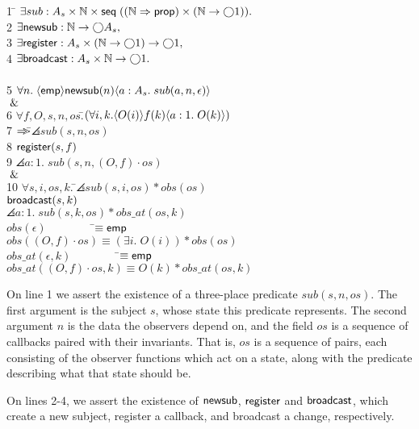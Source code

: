 \begin{tabbing}
1 \qquad \= $\exists sub : A_s \times \mathbb{N} \times \mathsf{seq}\;{((\mathbb{N} \Rightarrow \mathsf{prop}) \times (\mathbb{N} \to \bigcirc{1}))}.$ \\
2 \> $\exists \mathsf{newsub} : \mathbb{N} \to \bigcirc{A_s},$ \\ 
3 \> $\exists \mathsf{register} : A_s \times (\mathbb{N} \to \bigcirc{1}) \to \bigcirc{1},$ \\
4 \> $\exists \mathsf{broadcast} : A_s \times \mathbb{N} \to \bigcirc{1}.$ \\
\\[0.5em]
5 \>$\forall n.\; \langle{\mathsf{emp}}\rangle{{\mathsf{newsub}(n)}}\langle{a:A_s}.\;{sub(a, n, \epsilon)}\rangle$ \\
\> $\;\&\;$ \\
6 \> $\forall f, O, s, n, os. $\=$(\forall i, k. \langle{O(i)}\rangle{{f(k)}}\langle{a:1}.\;{O(k)}\rangle)$ \\
7\> \>$\Rightarrow\!\!\!>$\=$\angles{sub(s, n, os)}$ \\
8\> \>          \>${\mathsf{register}(s, f)}$ \\
9 \> \>          \>$\angles{a:1.\; sub(s, n, (O,f)\cdot os)}$ \\
\> $\;\&\;$ \\
10 \> $\forall s,i,os,k.\; $\=$\angles{sub(s, i, os) * obs(os)}$ \\
  \>                       \>${\mathsf{broadcast}}(s,k)$ \\
  \>                       \>$\angles{a:1.\; sub(s, k, os) * obs\_at(os, k)}$ 
\\[0.5em]
$obs(\epsilon) \;\qquad\qquad $\=$\equiv \mathsf{emp}$ \\
$obs((O,f)\cdot os) $\>$\equiv (\exists i.\; O(i)) * obs(os)$ 
\\[0.5em]
$obs\_at(\epsilon, k) \;\qquad\qquad $\=$\equiv \mathsf{emp}$ \\
$obs\_at((O,f)\cdot os, k) $\>$\equiv O(k) * obs\_at(os, k)$ 
\\
\end{tabbing}

%
On line 1 we assert the existence of a three-place predicate $sub(s,
n, os)$. The first argument is the subject $s$, whose state this
predicate represents. The second argument $n$ is the data the
observers depend on, and the field $os$ is a sequence of callbacks
paired with their invariants. That is, $os$ is a sequence of pairs,
each consisting of the observer functions which act on a state, along
with the predicate describing what that state should be.

On lines 2-4, we assert the existence of $\mathsf{newsub}$,
$\mathsf{register}$ and $\mathsf{broadcast}$, which create a new
subject, register a callback, and broadcast a change, respectively.

